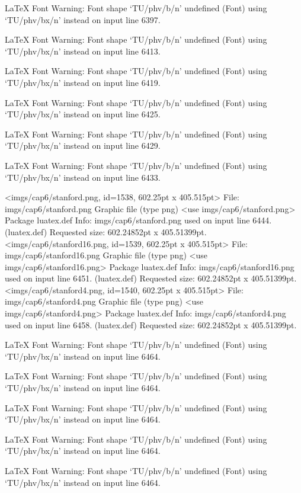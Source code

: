 LaTeX Font Warning: Font shape `TU/phv/b/n' undefined
(Font)              using `TU/phv/bx/n' instead on input line 6397.


LaTeX Font Warning: Font shape `TU/phv/b/n' undefined
(Font)              using `TU/phv/bx/n' instead on input line 6413.


LaTeX Font Warning: Font shape `TU/phv/b/n' undefined
(Font)              using `TU/phv/bx/n' instead on input line 6419.


LaTeX Font Warning: Font shape `TU/phv/b/n' undefined
(Font)              using `TU/phv/bx/n' instead on input line 6425.


LaTeX Font Warning: Font shape `TU/phv/b/n' undefined
(Font)              using `TU/phv/bx/n' instead on input line 6429.


LaTeX Font Warning: Font shape `TU/phv/b/n' undefined
(Font)              using `TU/phv/bx/n' instead on input line 6433.

<imgs/cap6/stanford.png, id=1538, 602.25pt x 405.515pt>
File: imgs/cap6/stanford.png Graphic file (type png)
<use imgs/cap6/stanford.png>
Package luatex.def Info: imgs/cap6/stanford.png  used on input line 6444.
(luatex.def)             Requested size: 602.24852pt x 405.51399pt.
<imgs/cap6/stanford16.png, id=1539, 602.25pt x 405.515pt>
File: imgs/cap6/stanford16.png Graphic file (type png)
<use imgs/cap6/stanford16.png>
Package luatex.def Info: imgs/cap6/stanford16.png  used on input line 6451.
(luatex.def)             Requested size: 602.24852pt x 405.51399pt.
<imgs/cap6/stanford4.png, id=1540, 602.25pt x 405.515pt>
File: imgs/cap6/stanford4.png Graphic file (type png)
<use imgs/cap6/stanford4.png>
Package luatex.def Info: imgs/cap6/stanford4.png  used on input line 6458.
(luatex.def)             Requested size: 602.24852pt x 405.51399pt.

LaTeX Font Warning: Font shape `TU/phv/b/n' undefined
(Font)              using `TU/phv/bx/n' instead on input line 6464.


LaTeX Font Warning: Font shape `TU/phv/b/n' undefined
(Font)              using `TU/phv/bx/n' instead on input line 6464.


LaTeX Font Warning: Font shape `TU/phv/b/n' undefined
(Font)              using `TU/phv/bx/n' instead on input line 6464.


LaTeX Font Warning: Font shape `TU/phv/b/n' undefined
(Font)              using `TU/phv/bx/n' instead on input line 6464.


LaTeX Font Warning: Font shape `TU/phv/b/n' undefined
(Font)              using `TU/phv/bx/n' instead on input line 6464.


